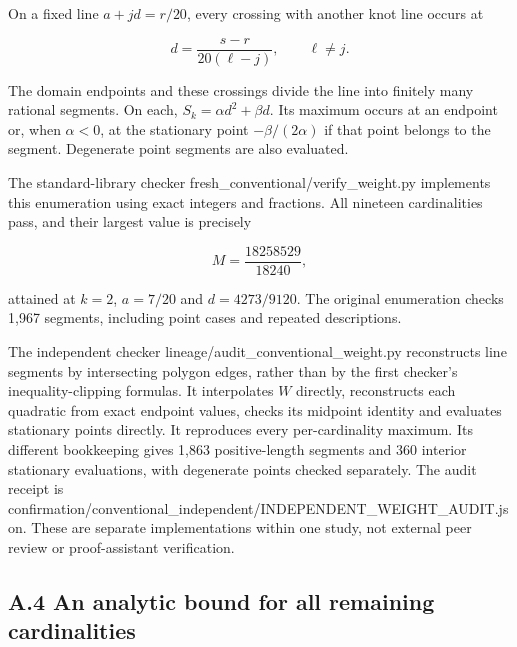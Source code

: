 \documentclass[11pt,a4paper]{article}
\renewcommand{\texttt}[1]{{\ttfamily\small #1}}
\begin{document}
\begin{samepage}

On a fixed line \(a+jd=r/20\), every crossing with another knot line
occurs at

\[d=\frac{s-r}{20(\ell-j)},\qquad \ell\ne j.\]

\end{samepage}

The domain endpoints and these crossings divide the line into finitely
many rational segments. On each, \(S_k=\alpha d^2+\beta d\). Its maximum
occurs at an endpoint or, when \(\alpha<0\), at the stationary point
\(-\beta/(2\alpha)\) if that point belongs to the segment. Degenerate
point segments are also evaluated.

\begin{samepage}

The standard-library checker
\texttt{fresh\_conventional/verify\_weight.py} implements this
enumeration using exact integers and fractions. All nineteen
cardinalities pass, and their largest value is precisely

\[M=\frac{18258529}{18240},\]

\end{samepage}

attained at \(k=2\), \(a=7/20\) and \(d=4273/9120\). The original
enumeration checks 1,967 segments, including point cases and repeated
descriptions.

The independent checker \texttt{lineage/audit\_conventional\_weight.py}
reconstructs line segments by intersecting polygon edges, rather than by
the first checker's inequality-clipping formulas. It interpolates \(W\)
directly, reconstructs each quadratic from exact endpoint values, checks
its midpoint identity and evaluates stationary points directly. It
reproduces every per-cardinality maximum. Its different bookkeeping
gives 1,863 positive-length segments and 360 interior stationary
evaluations, with degenerate points checked separately. The audit
receipt is
\texttt{confirmation/conventional\_independent/INDEPENDENT\_WEIGHT\_AUDIT.json}.
These are separate implementations within one study, not external peer
review or proof-assistant verification.


\hypertarget{a.4-an-analytic-bound-for-all-remaining-cardinalities}{%
\subsection{A.4 An analytic bound for all remaining
cardinalities}\label{a.4-an-analytic-bound-for-all-remaining-cardinalities}}
\end{document}
